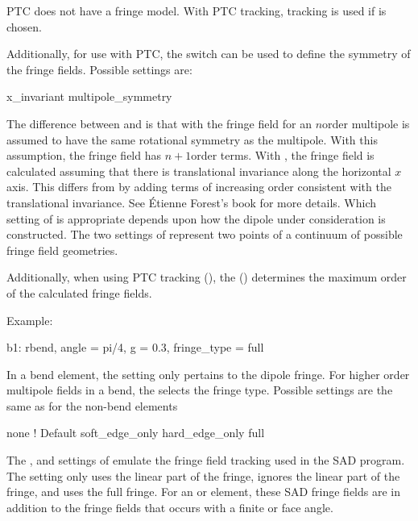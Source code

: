 {PTC does not have a  fringe model.
With PTC tracking,  tracking is used if  is chosen.

Additionally, for use with PTC, the  switch can be used
to define the symmetry of the fringe fields. Possible settings are:
\begin{example}
  x_invariant
  multipole_symmetry
\end{example}
The difference between  and  is that with
 the fringe field for an $n$\Th order multipole is assumed to have the same
rotational symmetry as the multipole. With this assumption, the fringe field has $n+1$\St order
terms.  With , the fringe field is calculated assuming that there is translational
invariance along the horizontal $x$ axis. This differs from  by adding terms
of increasing order consistent with the translational invariance. See \'Etienne Forest's
book\cite{b:forest} for more details. Which setting of  is appropriate
depends upon how the dipole under consideration is constructed. The two settings of
 represent two points of a continuum of possible fringe field geometries.

Additionally, when using PTC tracking (), the 
() determines the maximum order of the calculated fringe fields.

Example:
\begin{example}
  b1: rbend, angle = pi/4, g = 0.3, fringe_type = full
\end{example}

In a bend element, the  setting only pertains to the dipole fringe. For higher order
multipole fields in a bend, the  selects the fringe type. Possible
settings are the same as for the non-bend  elements
\begin{example}
  none              ! Default 
  soft_edge_only
  hard_edge_only
  full
\end{example}

The ,  and  settings of  emulate
the fringe field tracking used in the SAD program\cite{b:sad}.  The  setting only
uses the linear part of the fringe,  ignores the linear part of the fringe, and
 uses the full fringe.  For an  or  element, these SAD fringe
fields are in addition to the fringe fields that occurs with a finite  or  face angle.

}
